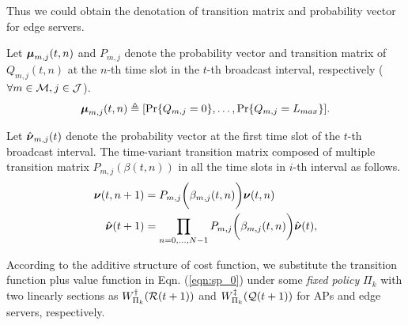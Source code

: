 Thus we could obtain the denotation of transition matrix and probability vector for edge servers.
\begin{definition}
    Let $\boldsymbol{\mu}_{m,j}(t,n)$ and $P_{m,j}$ denote the probability vector and transition matrix of $Q_{m,j}(t,n)$ at the $n$-th time slot in the $t$-th broadcast interval, respectively ($\forall m\in\mathcal{M}, j\in\mathcal{J}$).
    \begin{align}
        \boldsymbol{\mu}_{m,j}(t,n) \triangleq [\Pr\{Q_{m,j}=0\}, \dots, \Pr\{Q_{m,j}=L_{max}\}].
    \end{align}

    Let $\hat{\boldsymbol{\nu}}_{m,j}(t)$ denote the probability vector at the first time slot of the $t$-th broadcast interval.
    The time-variant transition matrix composed of multiple transition matrix $P_{m,j}(\beta({t,n}))$ in all the time slots in $i$-th interval as follows.
    \begin{align}
        \boldsymbol{\nu}({t,n+1}) &= P_{m,j}\bigg(\beta_{m,j}({t,n})\bigg) \boldsymbol{\nu}({t,n})
        \\
        \hat{\boldsymbol{\nu}}(t+1) &= \prod_{n=0,\dots,N-1} P_{m,j}\bigg(\beta_{m,j}({t,n})\bigg) \hat{\boldsymbol{\nu}}(t),
        \label{eqn_4}
    \end{align}
\end{definition}

According to the additive structure of cost function, we substitute the transition function plus value function in Eqn. (\ref{eqn:sp_0}) under some \emph{fixed policy} $\Pi_{k}$ with two linearly sections as $W^{\dagger}_{\Pi_{k}}(\mathcal{R}(t+1))$ and $W^{\ddagger}_{\Pi_{k}}(\mathcal{Q}(t+1))$ for APs and edge servers, respectively.